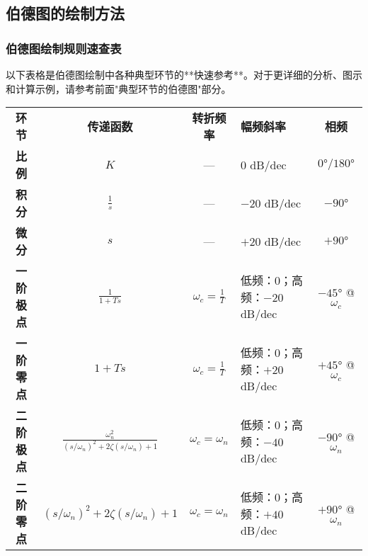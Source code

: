 \subsection{伯德图的绘制方法}

\subsubsection{伯德图绘制规则速查表}

以下表格是伯德图绘制中各种典型环节的**快速参考**。对于更详细的分析、图示和计算示例，请参考前面"典型环节的伯德图"部分。

{\renewcommand{\arraystretch}{2.0}
\small
\begin{center}
\begin{tabular}{|c|c|c|p{4.8cm}|c|}
\hline
\rowcolor{blue!30}
\multicolumn{5}{|c|}{\Large\textbf{伯德图典型环节速查表}} \\
\hline
\rowcolor{blue!15}
\textbf{环节} & \textbf{传递函数} & \textbf{转折频率} & \textbf{幅频斜率} & \textbf{相频} \\
\hline

\rowcolor{gray!8}
\textbf{比例} & $K$ & — & $0$ dB/dec & $0°/180°$ \\
\hline

\rowcolor{white}
\textbf{积分} & $\frac{1}{s}$ & — & $-20$ dB/dec & $-90°$ \\
\hline

\rowcolor{gray!8}
\textbf{微分} & $s$ & — & $+20$ dB/dec & $+90°$ \\
\hline

\rowcolor{white}
\textbf{一阶极点} & $\frac{1}{1+Ts}$ & $\omega_c = \frac{1}{T}$ & 
低频：$0$；高频：$-20$ dB/dec & 
$-45°$ @ $\omega_c$ \\
\hline

\rowcolor{gray!8}
\textbf{一阶零点} & $1+Ts$ & $\omega_c = \frac{1}{T}$ & 
低频：$0$；高频：$+20$ dB/dec & 
$+45°$ @ $\omega_c$ \\
\hline

\rowcolor{white}
\textbf{二阶极点} & $\frac{\omega_n^2}{(s/\omega_n)^2+2\zeta(s/\omega_n)+1}$ & $\omega_c = \omega_n$ & 
低频：$0$；高频：$-40$ dB/dec & 
$-90°$ @ $\omega_n$ \\
\hline

\rowcolor{gray!8}
\textbf{二阶零点} & $(s/\omega_n)^2+2\zeta(s/\omega_n)+1$ & $\omega_c = \omega_n$ & 
低频：$0$；高频：$+40$ dB/dec & 
$+90°$ @ $\omega_n$ \\
\hline

\end{tabular}
\end{center}
}

